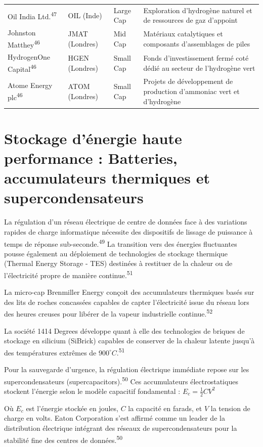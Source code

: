 \documentclass[11pt,a4paper]{article}
\begin{document}
\begin{longtable}{p{3cm} p{3.5cm} p{3cm} p{5cm}}
Oil India Ltd.\textsuperscript{47} & OIL (Inde) & Large Cap & Exploration d'hydrogène naturel et de ressources de gaz d'appoint \\
Johnston Matthey\textsuperscript{46} & JMAT (Londres) & Mid Cap & Matériaux catalytiques et composants d'assemblages de piles \\
HydrogenOne Capital\textsuperscript{46} & HGEN (Londres) & Small Cap & Fonds d'investissement fermé coté dédié au secteur de l'hydrogène vert \\
Atome Energy plc\textsuperscript{46} & ATOM (Londres) & Small Cap & Projets de développement de production d'ammoniac vert et d'hydrogène \\
\bottomrule
\end{longtable}

\section*{Stockage d'énergie haute performance : Batteries, accumulateurs thermiques et supercondensateurs}

La régulation d'un réseau électrique de centre de données face à des variations rapides de charge informatique nécessite des dispositifs de lissage de puissance à temps de réponse sub-seconde.\textsuperscript{49} La transition vers des énergies fluctuantes pousse également au déploiement de technologies de stockage thermique (Thermal Energy Storage - TES) destinées à restituer de la chaleur ou de l'électricité propre de manière continue.\textsuperscript{51}

La micro-cap Brenmiller Energy conçoit des accumulateurs thermiques basés sur des lits de roches concassées capables de capter l'électricité issue du réseau lors des heures creuses pour libérer de la vapeur industrielle continue.\textsuperscript{52}

La société 1414 Degrees développe quant à elle des technologies de briques de stockage en silicium (SiBrick) capables de conserver de la chaleur latente jusqu'à des températures extrêmes de $900^\circ C$.\textsuperscript{51}

Pour la sauvegarde d'urgence, la régulation électrique immédiate repose sur les supercondensateurs (supercapacitors).\textsuperscript{50} Ces accumulateurs électrostatiques stockent l'énergie selon le modèle capacitif fondamental :
$E_c = \frac{1}{2} C V^2$

Où $E_c$ est l'énergie stockée en joules, $C$ la capacité en farads, et $V$ la tension de charge en volts. Eaton Corporation s'est affirmé comme un leader de la distribution électrique intégrant des réseaux de supercondensateurs pour la stabilité fine des centres de données.\textsuperscript{50}
\end{document}
